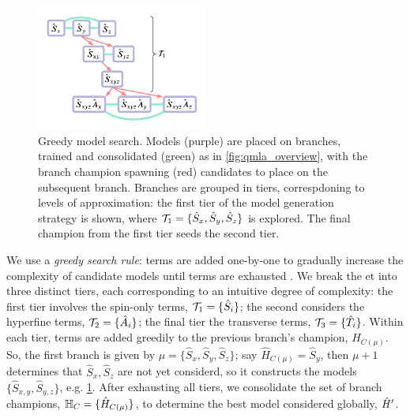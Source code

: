 \begin{figure}
    \begin{center}
        \includegraphics[width=0.5\textwidth]{experimental_study/figures/greedy_search.pdf}
    \end{center}
    \caption[Greedy model search]{
        Greedy \gls{model search}. 
        Models (purple) are placed on branches, trained and consolidated (green) as in \cref{fig:qmla_overview}, 
            with the branch champion spawning (red) candidates to place on the subsequent branch.  
        Branches are grouped in tiers, correspdoning to levels of approximation:
            the first tier of the model generation strategy is shown, 
            where $\mathcal{T}_1 = \{ \hat{S}_x, \hat{S}_y, \hat{S}_z\}$ is explored. 
        The final champion from the first tier seeds the second tier. 
    }
    \label{fig:greedy_search}
\end{figure}

We use a \emph{greedy search rule}: 
    terms are added one-by-one to gradually increase the complexity of candidate models until terms are exhausted \cite{russell2002artificial}.  
We break the \gls{et} into three distinct tiers, each corresponding to an intuitive degree of complexity:
    the first tier involves the spin-only terms, $\mathcal{T}_1 = \{ \hat{S}_i \}$; 
    the second considers the hyperfine terms, $\mathcal{T}_2 = \{ \hat{A}_i \}$;
    the final tier the transverse terms, $\mathcal{T}_3 = \{ \hat{T}_i\}$.  
Within each tier, terms are added greedily to the previous branch's champion, $\hat{H}_{C(\mu)}$.
So, the first branch is given by $\mu = \{ \hat{S}_x, \hat{S}_y, \hat{S}_z\}$;
    say $\hat{H}_{C(\mu)} = \hat{S}_y$, then $\mu + 1$  determines that $\hat{S}_x, \hat{S}_z$ 
    are not yet considerd, so it constructs the models $\{\hat{S}_{x,y}, \hat{S}_{y,z}\}$, e.g. \cref{fig:greedy_search}. 
After exhausting all tiers, we consolidate the set of branch champions, $\mathbb{H}_C = \{ \hat{H}_{C(\mu)}\}$, 
    to determine the best model considered globally, $\hat{H}^{\prime}$.  
\par 

